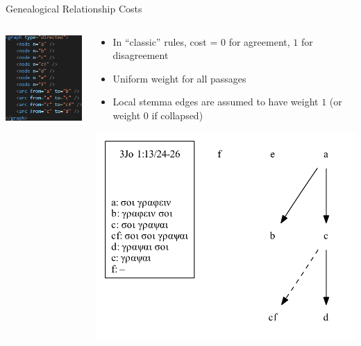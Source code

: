 \documentclass[10pt]{beamer}
\begin{document}
	\begin{frame}{Genealogical Relationship Costs}
		\begin{columns}
			\begin{column}{0.4\textwidth}
				\includegraphics[scale=0.6667]{../graphics/B25K1V13U24-26-local-stemma-xml.png}
			\end{column}
			\begin{column}{0.55\textwidth}
				\begin{itemize}
					\item In ``classic'' rules, cost = $0$ for agreement, $1$ for disagreement
					\item Uniform weight for all passages
					\item Local stemma edges are assumed to have weight $1$ (or weight $0$ if collapsed)
				\end{itemize}
				\includegraphics[width=\textwidth]{../graphics/B25K1V13U24-26-local-stemma.pdf}
			\end{column}
		\end{columns}
	\end{frame}
\end{document}
